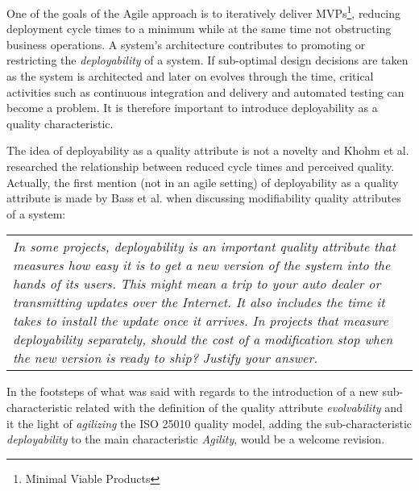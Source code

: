 \documentclass[a4paper, 10pt, conference]{ieeeconf}
\begin{document}
\vspace{3 mm}

One of the goals of the Agile approach is to iteratively deliver MVPs\footnote{Minimal Viable Products}, reducing deployment cycle times to a minimum while at the same time not obstructing business operations. A system's architecture contributes to promoting or restricting the \textit{deployability} of a system. If sub-optimal design decisions are taken as the system is architected and later on evolves through the time, critical activities such as continuous integration and delivery and automated testing can become a problem. It is therefore important to introduce deployability as a quality characteristic. 

\vspace{3 mm}

The idea of deployability as a quality attribute is not a novelty and Khohm et al. \cite{Khomh2012} researched the relationship between reduced cycle times and perceived quality. Actually, the first mention (not in an agile setting) of deployability as a quality attribute is made by Bass et al. \cite{Bass2012} when discussing modifiability quality attributes of a system:

\vspace{3 mm}

\begin{tabular}{|p{7.6cm}}
\textit{In some projects, deployability is an important quality attribute that measures how easy it is to get a new version of the system into the hands of its users. This might mean a trip to your auto dealer or transmitting updates over the Internet. It also includes the time it takes to install the update once it arrives. In projects that measure deployability separately, should the cost of a modification stop when the new version is ready to ship? Justify your answer.}\\
\end{tabular}

\vspace{3 mm}

In the footsteps of what was said with regards to the introduction of a new sub-characteristic related with the definition of the quality attribute \textit{evolvability} and it the light of \textit{agilizing} the ISO 25010 quality model, adding the sub-characteristic \textit{deployability} to the main characteristic \textit{Agility}, would be a welcome revision.

\vspace{3 mm}
\end{document}
